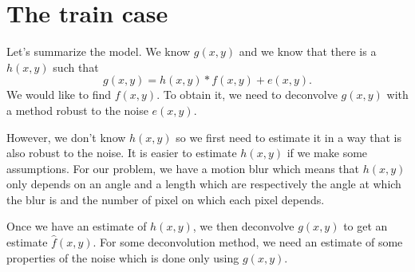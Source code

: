\chapter{The train case} %

Let's summarize the model.
We know $g(x,y)$ and we know that there is a $h(x,y)$ such that
\[ g(x,y) = h(x,y) * f(x,y) + e(x,y). \]
We would like to find $f(x,y)$.
To obtain it, we need to deconvolve $g(x,y)$ with a method
robust to the noise $e(x,y)$.

However, we don't know $h(x,y)$ so we first need to estimate it
in a way that is also robust to the noise.
It is easier to estimate $h(x,y)$ if we make some assumptions.
For our problem, we have a motion blur which means that
$h(x,y)$ only depends on an angle and a length which are
respectively the angle at which the blur is and the number of
pixel on which each pixel depends.

Once we have an estimate of $h(x,y)$, we then deconvolve
$g(x,y)$ to get an estimate $\hat{f}(x,y)$.
For some deconvolution method, we need an estimate of
some properties of the noise which is done only using $g(x,y)$.




